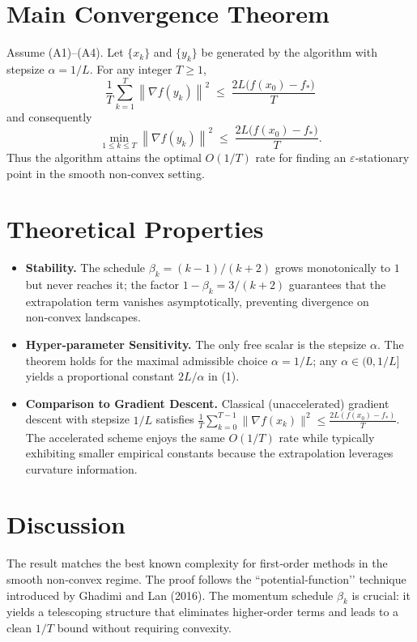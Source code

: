 \documentclass{article}
\newcommand{\norm}[1]{\left\lVert#1\right\rVert}
\newcommand{\grad}{\nabla}
\begin{document}
\section*{Main Convergence Theorem}
\begin{theorem}\label{thm:main}
Assume (A1)–(A4).  Let $\{x_k\}$ and $\{y_k\}$ be generated by the algorithm
with stepsize $\alpha=1/L$.  For any integer $T\ge 1$,
\[
\boxed{
\frac{1}{T}\sum_{k=1}^{T}\norm{\grad f(y_k)}^{2}
\;\le\;
\frac{2L\bigl(f(x_{0})-f_*\bigr)}{T}
}
\tag{1}
\]
and consequently
\[
\min_{1\le k\le T}\norm{\grad f(y_k)}^{2}
\;\le\;
\frac{2L\bigl(f(x_{0})-f_*\bigr)}{T}.
\tag{2}
\]
Thus the algorithm attains the optimal $O(1/T)$ rate for finding an
$\varepsilon$‑stationary point in the smooth non‑convex setting.
\end{theorem}

\section*{Theoretical Properties}
\begin{itemize}
\item \textbf{Stability.} The schedule $\beta_k=(k-1)/(k+2)$ grows
monotonically to $1$ but never reaches it; the factor $1-\beta_k=3/(k+2)$
guarantees that the extrapolation term vanishes asymptotically,
preventing divergence on non‑convex landscapes.
\item \textbf{Hyper‑parameter Sensitivity.}
  The only free scalar is the stepsize $\alpha$.  The theorem holds for the
  maximal admissible choice $\alpha=1/L$; any $\alpha\in(0,1/L]$ yields a
  proportional constant $2L/\alpha$ in (1).
\item \textbf{Comparison to Gradient Descent.}
  Classical (unaccelerated) gradient descent with stepsize $1/L$ satisfies
  $\frac{1}{T}\sum_{k=0}^{T-1}\|\grad f(x_k)\|^2\le\frac{2L(f(x_0)-f_*)}{T}$.
  The accelerated scheme enjoys the same $O(1/T)$ rate while typically
  exhibiting smaller empirical constants because the extrapolation
  leverages curvature information.
\end{itemize}

\section*{Discussion}
The result matches the best known complexity for first‑order methods in the
smooth non‑convex regime.  The proof follows the “potential‑function’’
technique introduced by Ghadimi and Lan (2016).  The momentum schedule
$\beta_k$ is crucial: it yields a telescoping structure that eliminates
higher‑order terms and leads to a clean $1/T$ bound without requiring
convexity.
\end{document}
